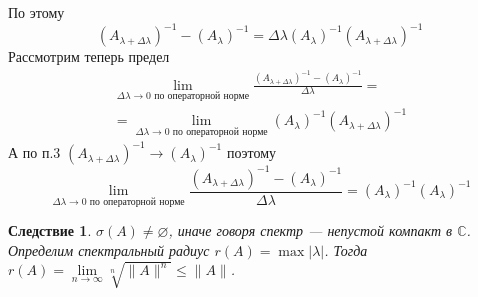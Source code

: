 \documentclass[12pt]{article}
\newcommand{\Al}{A_\lambda}
\newcommand{\Alo}{(\Al)^{-1}}
\begin{document}
\begin{Proof}
\begin{enumerate}
{            По этому 
            $$
            (A_{\lambda + \Delta\lambda})^{-1} - \Alo = \Delta\lambda \Alo (A_{\lambda + \Delta \lambda})^{-1}
            $$
            Рассмотрим теперь предел
            \begin{multline*}
            \lim \limits_{\Delta\lambda \to 0 \text{ по операторной норме}} \frac{(A_{\lambda + \Delta\lambda})^{-1} - \Alo}{\Delta\lambda} = \\
            = \lim \limits_{\Delta\lambda \to 0 \text{ по операторной норме}}  \Alo (A_{\lambda + \Delta\lambda})^{-1}
            \end{multline*}
            А по п.3 $(A_{\lambda + \Delta\lambda})^{-1} \to \Alo$ поэтому
            $$
             \lim \limits_{\Delta\lambda \to 0 \text{ по операторной норме}} \frac{(A_{\lambda + \Delta\lambda})^{-1} - \Alo}{\Delta\lambda} = \Alo \Alo
             $$
            }
    \end{enumerate}
\end{Proof}
\newtheorem{Sled1}{Следствие}
\begin{Sled1}
    $\sigma(A) \ne \varnothing$, иначе говоря спектр --- непустой компакт в $\mathbb C$. Определим спектральный радиус $r(A) = \max |\lambda|$.
    Тогда $r(A) = \lim \limits_{n \to \infty} \sqrt[n]{\|A\|^n} \le \|A\|$.
\end{Sled1}
\end{document}
